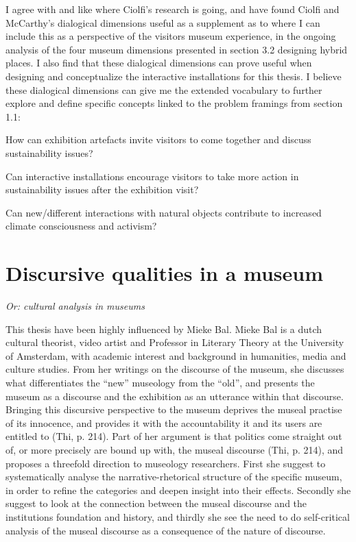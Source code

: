 I agree with and like where Ciolfi’s research is going, and have found Ciolfi and McCarthy’s dialogical dimensions useful as a supplement as to where I can include this as a perspective of the visitors museum experience, in the ongoing analysis of the four museum dimensions presented in section 3.2 designing hybrid places. I also find that these dialogical dimensions can prove useful when designing and conceptualize the interactive installations for this thesis. I believe these dialogical dimensions can give me the extended vocabulary to further explore and define specific concepts linked to the problem framings from section 1.1:

How can exhibition artefacts invite visitors to come together and discuss sustainability issues?\par
Can interactive installations encourage visitors to take more action in sustainability issues after the exhibition visit?\par
Can new/different interactions with natural objects contribute to increased climate consciousness and activism?\par


\section{Discursive qualities in a museum}
\par
\emph{Or: cultural analysis in museums}
\par

This thesis have been highly influenced by Mieke Bal. Mieke Bal is a dutch cultural theorist, video artist and Professor in Literary Theory at the University of Amsterdam, with academic interest and background in humanities, media and culture studies. From her writings on the discourse of the museum, she discusses what differentiates the “new” museology from the “old”, and presents the museum as a discourse and the exhibition as an utterance within that discourse. Bringing this discursive perspective to the museum deprives the museal practise of its innocence, and provides it with the accountability it and its users are entitled to (Thi, p. 214). Part of her argument is that politics come straight out of, or more precisely are bound up with, the museal discourse (Thi, p. 214), and proposes a threefold direction to museology researchers. First she suggest to systematically analyse the narrative-rhetorical structure of the specific museum, in order to refine the categories and deepen insight into their effects. Secondly she suggest to look at the connection between the museal discourse and the institutions foundation and history, and thirdly she see the need to do self-critical analysis of the museal discourse as a consequence of the nature of discourse.

